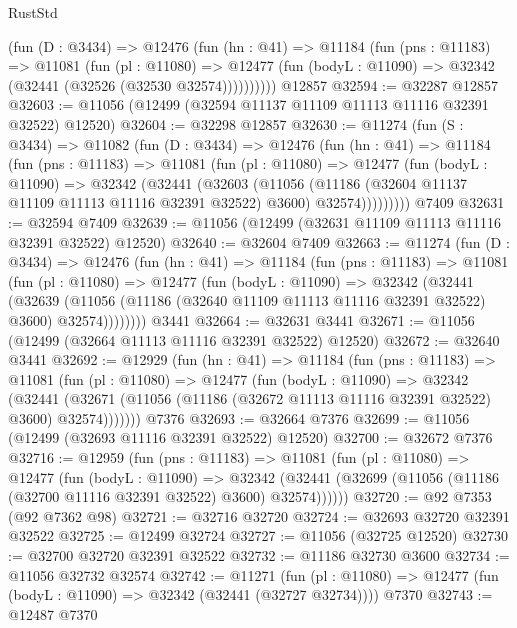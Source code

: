 \begin{lexlean}{RustStd}
\begin{coremodule}
        (fun (D : @3434) =>
        @12476
          (fun (hn : @41) =>
          @11184
            (fun (pns : @11183) =>
            @11081
              (fun (pl : @11080) =>
              @12477 (fun (bodyL : @11090) => @32342 (@32441 (@32526 (@32530 @32574))))))))))
    @12857
@32594 := @32287 @12857
@32603 := @11056 (@12499 (@32594 @11137 @11109 @11113 @11116 @32391 @32522) @12520)
@32604 := @32298 @12857
@32630 := @11274
    (fun (S : @3434) =>
    @11082
      (fun (D : @3434) =>
      @12476
        (fun (hn : @41) =>
        @11184
          (fun (pns : @11183) =>
          @11081
            (fun (pl : @11080) =>
            @12477
              (fun (bodyL : @11090) =>
              @32342
                (@32441
                  (@32603
                    (@11056
                      (@11186 (@32604 @11137 @11109 @11113 @11116 @32391 @32522) @3600)
                      @32574)))))))))
    @7409
@32631 := @32594 @7409
@32639 := @11056 (@12499 (@32631 @11109 @11113 @11116 @32391 @32522) @12520)
@32640 := @32604 @7409
@32663 := @11274
    (fun (D : @3434) =>
    @12476
      (fun (hn : @41) =>
      @11184
        (fun (pns : @11183) =>
        @11081
          (fun (pl : @11080) =>
          @12477
            (fun (bodyL : @11090) =>
            @32342
              (@32441
                (@32639
                  (@11056 (@11186 (@32640 @11109 @11113 @11116 @32391 @32522) @3600) @32574))))))))
    @3441
@32664 := @32631 @3441
@32671 := @11056 (@12499 (@32664 @11113 @11116 @32391 @32522) @12520)
@32672 := @32640 @3441
@32692 := @12929
    (fun (hn : @41) =>
    @11184
      (fun (pns : @11183) =>
      @11081
        (fun (pl : @11080) =>
        @12477
          (fun (bodyL : @11090) =>
          @32342
            (@32441
              (@32671 (@11056 (@11186 (@32672 @11113 @11116 @32391 @32522) @3600) @32574)))))))
    @7376
@32693 := @32664 @7376
@32699 := @11056 (@12499 (@32693 @11116 @32391 @32522) @12520)
@32700 := @32672 @7376
@32716 := @12959
    (fun (pns : @11183) =>
    @11081
      (fun (pl : @11080) =>
      @12477
        (fun (bodyL : @11090) =>
        @32342 (@32441 (@32699 (@11056 (@11186 (@32700 @11116 @32391 @32522) @3600) @32574))))))
@32720 := @92 @7353 (@92 @7362 @98)
@32721 := @32716 @32720
@32724 := @32693 @32720 @32391 @32522
@32725 := @12499 @32724
@32727 := @11056 (@32725 @12520)
@32730 := @32700 @32720 @32391 @32522
@32732 := @11186 @32730 @3600
@32734 := @11056 @32732 @32574
@32742 := @11271
    (fun (pl : @11080) => @12477 (fun (bodyL : @11090) => @32342 (@32441 (@32727 @32734))))
    @7370
@32743 := @12487 @7370

\end{coremodule}
\end{lexlean}
